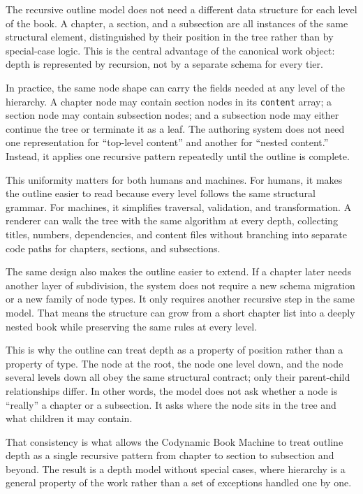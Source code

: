 The recursive outline model does not need a different data structure for each level of the book. A chapter, a section, and a subsection are all instances of the same structural element, distinguished by their position in the tree rather than by special-case logic. This is the central advantage of the canonical work object: depth is represented by recursion, not by a separate schema for every tier.

In practice, the same node shape can carry the fields needed at any level of the hierarchy. A chapter node may contain section nodes in its \texttt{content} array; a section node may contain subsection nodes; and a subsection node may either continue the tree or terminate it as a leaf. The authoring system does not need one representation for ``top-level content'' and another for ``nested content.'' Instead, it applies one recursive pattern repeatedly until the outline is complete.

This uniformity matters for both humans and machines. For humans, it makes the outline easier to read because every level follows the same structural grammar. For machines, it simplifies traversal, validation, and transformation. A renderer can walk the tree with the same algorithm at every depth, collecting titles, numbers, dependencies, and content files without branching into separate code paths for chapters, sections, and subsections.

The same design also makes the outline easier to extend. If a chapter later needs another layer of subdivision, the system does not require a new schema migration or a new family of node types. It only requires another recursive step in the same model. That means the structure can grow from a short chapter list into a deeply nested book while preserving the same rules at every level.

This is why the outline can treat depth as a property of position rather than a property of type. The node at the root, the node one level down, and the node several levels down all obey the same structural contract; only their parent-child relationships differ. In other words, the model does not ask whether a node is ``really'' a chapter or a subsection. It asks where the node sits in the tree and what children it may contain.

That consistency is what allows the Codynamic Book Machine to treat outline depth as a single recursive pattern from chapter to section to subsection and beyond. The result is a depth model without special cases, where hierarchy is a general property of the work rather than a set of exceptions handled one by one.

